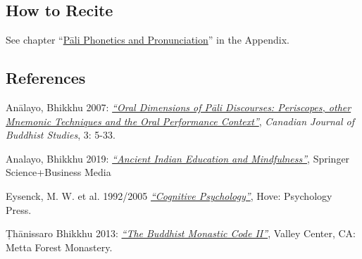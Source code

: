\subsection*{How to Recite}

See chapter ``\hyperref[phonetics]{Pāli Phonetics and Pronunciation}'' in the Appendix.

\ifninebythirteen\clearpage\fi

\subsection*{References}

Anālayo, Bhikkhu 2007: \href{https://www.buddhismuskunde.uni-hamburg.de/pdf/5-personen/analayo/oral-dimensions.pdf}{\textit{``Oral Dimensions of Pāli Discourses: Periscopes, other Mnemonic Techniques and the Oral Performance Context''}}, \textit{Canadian Journal of Buddhist Studies}, 3: 5-33.

Analayo, Bhikkhu 2019: \href{https://www.buddhismuskunde.uni-hamburg.de/pdf/5-personen/analayo/ancientindianeducation.pdf}{\textit{``Ancient Indian Education and Mindfulness''}}, Springer Science+Business Media

Eysenck, M. W. et al. 1992/2005 \href{https://psycnet.apa.org/record/2015-09422-000}{\textit{``Cognitive Psychology''}}, Hove: Psychology Press.

Ṭhānissaro Bhikkhu 2013:  \href{https://www.dhammatalks.org/Archive/Writings/Ebooks/BMC1&2_200826.pdf}{\textit{``The Buddhist Monastic Code II''}}, Valley Center, CA: Metta Forest Monastery.

\ifdigital

  \else

\clearpage

\fi


